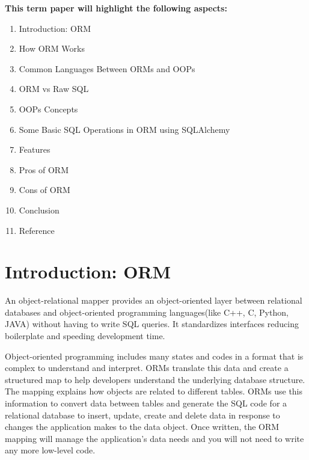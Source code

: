\documentclass[10pt,a4paper,twoside]{article}
\begin{document}
\item
\item
{\bf {\Large This term paper will highlight the following aspects:  }}\\
\begin{itemize}
\end{itemize}
\item 
\begin{enumerate}
\item Introduction: ORM
\item How ORM Works
\item Common Languages Between ORMs and OOPs
\item ORM vs Raw SQL
\item OOPs Concepts
\item Some Basic SQL Operations in ORM using SQLAlchemy 
\item Features
\item Pros of ORM
\item Cons of ORM
\item Conclusion
\item Reference 
\end{enumerate}

\section{Introduction: ORM}
\item An object-relational mapper provides an object-oriented layer between relational databases and object-oriented programming languages(like C++, C, Python, JAVA) without having to write SQL queries. It standardizes interfaces reducing boilerplate and speeding development time.
\item Object-oriented programming includes many states and codes in a format that is complex to understand and interpret. ORMs translate this data and create a structured map to help developers understand the underlying database structure. The mapping explains how objects are related to different tables. ORMs use this information to convert data between tables and generate the SQL code for a relational database to insert, update, create and delete data in response to changes the application makes to the data object. Once written, the ORM mapping will manage the application’s data needs and you will not need to write any more low-level code.
\end{document}
